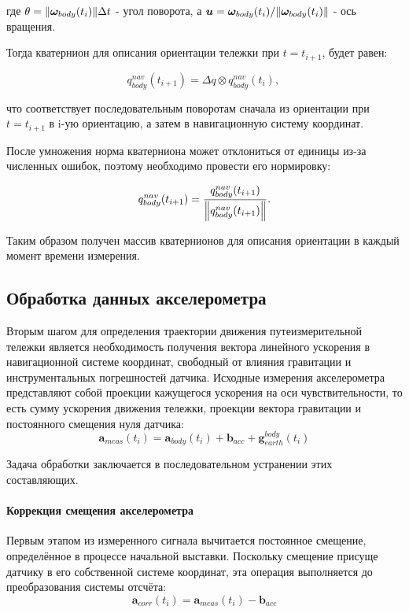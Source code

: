 где $\theta = \norm{\bm{\omega}_{body}(t_i)} \Delta t$ - угол поворота, а $\bm{u} = \bm{\omega}_{body}(t_i) / \norm{\bm{\omega}_{body}(t_i)}$ - ось вращения.

Тогда кватернион для описания ориентации тележки при $t = t_{i+1}$, будет равен:

\begin{equation}
	q_{body}^{nav}(t_{i+1}) = \Delta q \otimes q_{body}^{nav}(t_i) \text{, }
\end{equation}

что соответствует последовательным поворотам сначала из ориентации при $t = t_{i+1}$ в i-ую ориентацию, а затем в навигационную систему координат.

После умножения норма кватерниона может отклониться от единицы из-за численных ошибок, поэтому необходимо провести его нормировку:

\begin{equation*}
	q_{body}^{nav}(t_{i+1}) = \frac{q_{body}^{nav}(t_{i+1})}{\norm{q_{body}^{nav}(t_{i+1})}} \text{.}
\end{equation*}

Таким образом получен массив кватернионов для описания ориентации в каждый момент времени измерения.


\subsection{Обработка данных акселерометра}
Вторым шагом для определения траектории движения путеизмерительной тележки является необходимость получения вектора линейного ускорения в навигационной системе координат, свободный от влияния гравитации и инструментальных погрешностей датчика. Исходные измерения акселерометра представляют собой проекции кажущегося ускорения на оси чувствительности, то есть сумму ускорения движения тележки, проекции вектора гравитации и постоянного смещения нуля датчика:
\begin{equation}
	\bm{a}_{meas}(t_i) = \bm{a}_{body}(t_i) + \bm{b}_{acc} + \bm{g}_{earth}^{body}(t_i)
\end{equation}

Задача обработки заключается в последовательном устранении этих составляющих.

\paragraph{Коррекция смещения акселерометра}
Первым этапом из измеренного сигнала вычитается постоянное смещение, определённое в процессе начальной выставки. Поскольку смещение присуще датчику в его собственной системе координат, эта операция выполняется до преобразования системы отсчёта:
\begin{equation*}
	\bm{a}_{corr}(t_i) = \bm{a}_{meas}(t_i) - \bm{b}_{acc}
\end{equation*}

